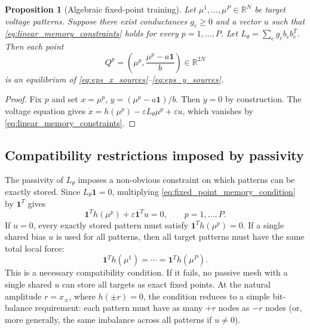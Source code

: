\documentclass[11pt]{article}
\newtheorem{proposition}{Proposition}
\begin{document}
\begin{proposition}[Algebraic fixed-point training]
  \label{prop:exact_memory_learning}
  Let $\mu^1,\ldots,\mu^P\in\mathbb{R}^N$ be target voltage patterns.
  Suppose there exist conductances $g_e\geq 0$ and a vector $u$ such
  that \eqref{eq:linear_memory_constraints} holds for every
  $p=1,\ldots,P$. Let $L_\theta=\sum_{e} g_e b_e b_e^T$. Then each
  point
  \begin{equation}
    Q^p=
    \left(
      \mu^p,
      \frac{\mu^p-a\mathbf{1}}{b}
    \right)
    \in\mathbb{R}^{2N}
  \end{equation}
  is an equilibrium of \eqref{eq:eps_x_sources}--\eqref{eq:eps_y_sources}.
\end{proposition}

\begin{proof}
  Fix $p$ and set $x=\mu^p$, $y=(\mu^p-a\mathbf{1})/b$. Then $\dot y=0$
  by construction. The voltage equation gives
  $\dot x = h(\mu^p)-\varepsilon L_\theta\mu^p+\varepsilon u$, which
  vanishes by \eqref{eq:linear_memory_constraints}.
\end{proof}

\subsection{Compatibility restrictions imposed by passivity}

The passivity of $L_\theta$ imposes a non-obvious constraint on which
patterns can be exactly stored. Since $L_\theta\mathbf{1}=0$, multiplying
\eqref{eq:fixed_point_memory_condition} by $\mathbf{1}^T$ gives
\begin{equation}
  \mathbf{1}^T h(\mu^p)
  +
  \varepsilon \mathbf{1}^T u
  =
  0,
  \qquad
  p=1,\ldots,P.
  \label{eq:mean_force_compatibility}
\end{equation}
If $u=0$, every exactly stored pattern must satisfy
$\mathbf{1}^T h(\mu^p)=0$. If a single shared bias $u$ is used for all
patterns, then all target patterns must have the same total local force:
\begin{equation}
  \mathbf{1}^T h(\mu^1)
  =
  \cdots
  =
  \mathbf{1}^T h(\mu^P).
  \label{eq:shared_bias_compatibility}
\end{equation}
This is a necessary compatibility condition. If it fails, no passive
mesh with a single shared $u$ can store all targets as exact fixed
points. At the natural amplitude $r = x_\pm$, where $h(\pm r) = 0$,
the condition reduces to a simple bit-balance requirement: each pattern
must have as many $+r$ nodes as $-r$ nodes (or, more generally, the
same imbalance across all patterns if $u \neq 0$).
\end{document}
